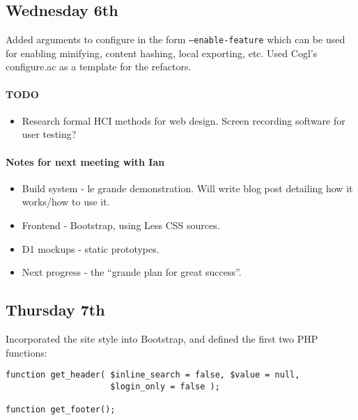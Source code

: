 \subsection{Wednesday 6th}
Added arguments to configure in the form \texttt{--enable-feature} which can be
used for enabling minifying, content hashing, local exporting, etc. Used Cogl's
configure.ac as a template for the refactors.

\paragraph{TODO}
\begin{itemize}
\item Research formal HCI methods for web design. Screen recording software for
  user testing?
\end{itemize}

\paragraph{Notes for next meeting with Ian}
\begin{itemize}
\item Build system - le grande demonstration. Will write blog post detailing how
  it works/how to use it.
\item Frontend - Bootstrap, using Less CSS sources.
\item D1 mockups - static prototypes.
\item Next progress - the ``grande plan for great success''.
\end{itemize}

\subsection{Thursday 7th}
Incorporated the site style into Bootstrap, and defined the first two PHP
functions:

\begin{verbatim}
function get_header( $inline_search = false, $value = null,
                     $login_only = false );

function get_footer();
\end{verbatim}
